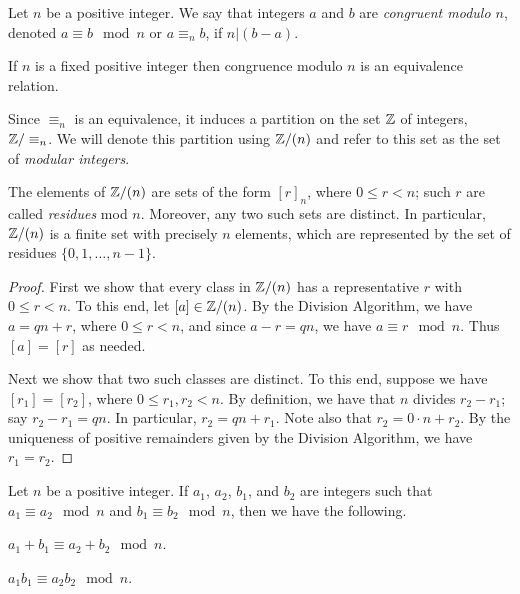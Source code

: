 \begin{dfn}
Let \(n\) be a positive integer.
We say that integers \(a\) and \(b\) are \emph{congruent modulo \(n\)}, denoted \(a \equiv b \mod n\) or \(a \equiv_n b\), if \(n|(b-a)\).
\end{dfn}

\begin{prop}
If \(n\) is a fixed positive integer then congruence modulo \(n\) is an equivalence relation. 
\end{prop}

Since \(\equiv_n\) is an equivalence, it induces a partition on the set \(\mathbb{Z}\) of integers, \(\mathbb{Z}/\equiv_n\).
We will denote this partition using \(\mathbb{Z}/(n)\) and refer to this set as the set of \emph{modular integers}.

\begin{prop}
The elements of \(\mathbb{Z}/(n)\) are sets of the form \([r]_n\), where \(0 \leq r < n\); such \(r\) are called \emph{residues} mod \(n\).
Moreover, any two such sets are distinct.
In particular, \(\mathbb{Z}/(n)\) is a finite set with precisely \(n\) elements, which are represented by the set of residues \(\{0,1,\ldots,n-1\}\). 
\end{prop}

\begin{proof}
First we show that every class in \(\mathbb{Z}/(n)\) has a representative \(r\) with \(0 \leq r < n\).
To this end, let \([a] \in \mathbb{Z}/(n)\).
By the Division Algorithm, we have \(a = qn + r\), where \(0 \leq r < n\), and since \(a - r = qn\), we have \(a \equiv r \mod n\).
Thus \([a] = [r]\) as needed.

Next we show that two such classes are distinct.
To this end, suppose we have \([r_1] = [r_2]\), where \(0 \leq r_1, r_2 < n\).
By definition, we have that \(n\) divides \(r_2 - r_1\); say \(r_2 - r_1 = qn\).
In particular, \(r_2 = qn + r_1\).
Note also that \(r_2 = 0 \cdot n + r_2\).
By the uniqueness of positive remainders given by the Division Algorithm, we have \(r_1 = r_2\).
\end{proof}


\begin{prop}
Let \(n\) be a positive integer.
If \(a_1\), \(a_2\), \(b_1\), and \(b_2\) are integers such that \(a_1 \equiv a_2 \mod n\) and \(b_1 \equiv b_2 \mod n\), then we have the following.
\begin{proplist}
\item \(a_1 + b_1 \equiv a_2 + b_2 \mod n\).
\item \(a_1 b_1 \equiv a_2 b_2 \mod n\).
\end{proplist}
\end{prop}

